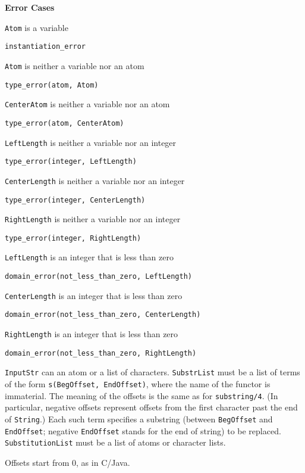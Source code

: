 \begin{description}
{\bf Error Cases}
\bi
\item  {\tt Atom} is a variable
\bi
\item {\tt instantiation\_error}
\ei
\item  {\tt Atom} is neither a variable nor an atom
\bi
\item {\tt type\_error(atom, Atom)}
\ei
\item  {\tt CenterAtom} is neither a variable nor an atom
\bi
\item {\tt type\_error(atom, CenterAtom)}
\ei
\item  {\tt LeftLength} is neither a variable nor an integer
\bi
\item  {\tt  type\_error(integer, LeftLength)}
\ei
\item  {\tt CenterLength} is neither a variable nor an integer
\bi
\item  {\tt  type\_error(integer, CenterLength)}
\ei
\item  {\tt RightLength} is neither a variable nor an integer
\bi
\item  {\tt type\_error(integer, RightLength)}
\ei
\item  {\tt LeftLength} is an integer that is less than zero
\bi
\item  {\tt  domain\_error(not\_less\_than\_zero, LeftLength)}
\ei
\item  {\tt CenterLength} is an integer that is less than zero
\bi
\item  {\tt  domain\_error(not\_less\_than\_zero, CenterLength)}
\ei
\item  {\tt RightLength} is an integer that is less than zero
\bi
\item  {\tt  domain\_error(not\_less\_than\_zero, RightLength)}
\ei
\ei



{\tt InputStr} can an atom or a list of characters.  {\tt SubstrList} must
be a list of terms of the form {\tt s(BegOffset, EndOffset)}, where the
name of the functor is immaterial.  The meaning of the offsets is the same
as for {\tt substring/4}. (In particular, negative offsets represent
offsets from the first character past the end of {\tt String}.)  Each such
term specifies a substring (between {\tt BegOffset} and {\tt EndOffset};
negative {\tt EndOffset} stands for the end of string) to be replaced.
{\tt SubstitutionList} must be a list of atoms or character lists.

Offsets start from 0, as in C/Java.


\end{description}
